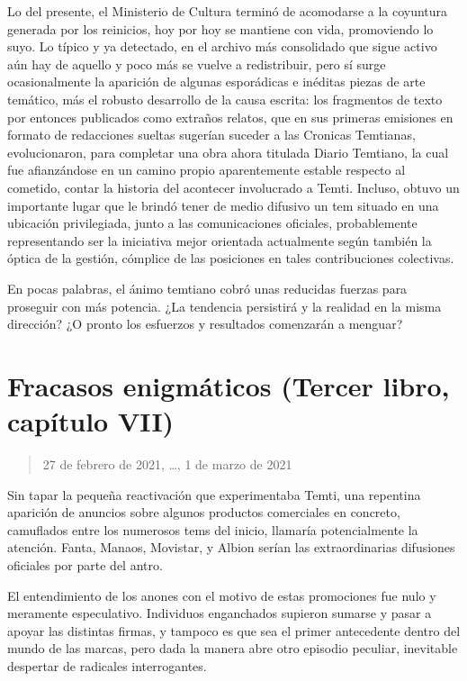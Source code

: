 \documentclass[
]{book}
\begin{document}
Lo del presente, el Ministerio de Cultura terminó de acomodarse a la coyuntura generada por los reinicios, hoy por hoy se mantiene con vida, promoviendo lo suyo. Lo típico y ya detectado, en el archivo más consolidado que sigue activo aún hay de aquello y poco más se vuelve a redistribuir, pero sí surge ocasionalmente la aparición de algunas esporádicas e inéditas piezas de arte temático, más el robusto desarrollo de la causa escrita: los fragmentos de texto por entonces publicados como extraños relatos, que en sus primeras emisiones en formato de redacciones sueltas sugerían suceder a las Cronicas Temtianas, evolucionaron, para completar una obra ahora titulada Diario Temtiano, la cual fue afianzándose en un camino propio aparentemente estable respecto al cometido, contar la historia del acontecer involucrado a Temti. Incluso, obtuvo un importante lugar que le brindó tener de medio difusivo un tem situado en una ubicación privilegiada, junto a las comunicaciones oficiales, probablemente representando ser la iniciativa mejor orientada actualmente según también la óptica de la gestión, cómplice de las posiciones en tales contribuciones colectivas.

En pocas palabras, el ánimo temtiano cobró unas reducidas fuerzas para proseguir con más potencia. ¿La tendencia persistirá y la realidad en la misma dirección? ¿O pronto los esfuerzos y resultados comenzarán a menguar?

\hypertarget{fracasos-enigmuxe1ticos-tercer-libro-capuxedtulo-vii}{%
\section{Fracasos enigmáticos (Tercer libro, capítulo VII)}\label{fracasos-enigmuxe1ticos-tercer-libro-capuxedtulo-vii}}

\begin{quote}
27 de febrero de 2021, \ldots, 1 de marzo de 2021
\end{quote}

Sin tapar la pequeña reactivación que experimentaba Temti, una repentina aparición de anuncios sobre algunos productos comerciales en concreto, camuflados entre los numerosos tems del inicio, llamaría potencialmente la atención. Fanta, Manaos, Movistar, y Albion serían las extraordinarias difusiones oficiales por parte del antro.

El entendimiento de los anones con el motivo de estas promociones fue nulo y meramente especulativo. Individuos enganchados supieron sumarse y pasar a apoyar las distintas firmas, y tampoco es que sea el primer antecedente dentro del mundo de las marcas, pero dada la manera abre otro episodio peculiar, inevitable despertar de radicales interrogantes.
\end{document}

